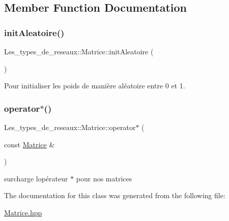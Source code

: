 \subsection{Member Function Documentation}
\mbox{\label{class_les__types__de__reseaux_1_1_matrice_ac8b34d8eed2d37979401bdfa7882c10e}} 
\subsubsection{\texorpdfstring{init\+Aleatoire()}{initAleatoire()}}
{\footnotesize\ttfamily Les\+\_\+types\+\_\+de\+\_\+reseaux\+::\+Matrice\+::init\+Aleatoire (\begin{DoxyParamCaption}{ }\end{DoxyParamCaption})}



Pour initialiser les poids de manière aléatoire entre 0 et 1. 

\mbox{\label{class_les__types__de__reseaux_1_1_matrice_a144c1b4b4ae020a7a54400f38c47e15a}} 
\subsubsection{\texorpdfstring{operator$\ast$()}{operator*()}}
{\footnotesize\ttfamily Les\+\_\+types\+\_\+de\+\_\+reseaux\+::\+Matrice\+::operator$\ast$ (\begin{DoxyParamCaption}\item[{const \hyperlink{class_les__types__de__reseaux_1_1_matrice}{Matrice} \&}]{ }\end{DoxyParamCaption})}



surcharge l\textquotesingle{}opérateur $\ast$ pour nos matrices 



The documentation for this class was generated from the following file\+:\begin{DoxyCompactItemize}
\item 
\hyperlink{_matrice_8hpp}{Matrice.\+hpp}\end{DoxyCompactItemize}
